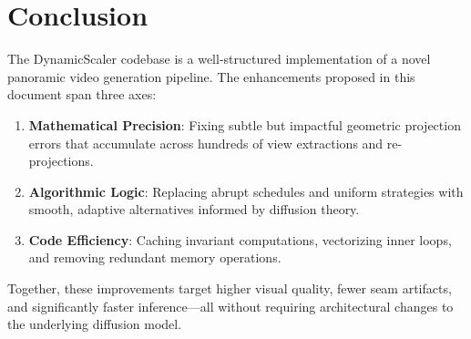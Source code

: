 \documentclass[11pt,a4paper]{article}
\begin{document}
\section{Conclusion}

The DynamicScaler codebase is a well-structured implementation of a novel panoramic video generation pipeline.
The enhancements proposed in this document span three axes:

\begin{enumerate}
    \item \textbf{Mathematical Precision}: Fixing subtle but impactful geometric projection errors that accumulate across hundreds of view extractions and re-projections.
    \item \textbf{Algorithmic Logic}: Replacing abrupt schedules and uniform strategies with smooth, adaptive alternatives informed by diffusion theory.
    \item \textbf{Code Efficiency}: Caching invariant computations, vectorizing inner loops, and removing redundant memory operations.
\end{enumerate}

Together, these improvements target higher visual quality, fewer seam artifacts, and significantly faster inference---all without requiring architectural changes to the underlying diffusion model.
\end{document}
